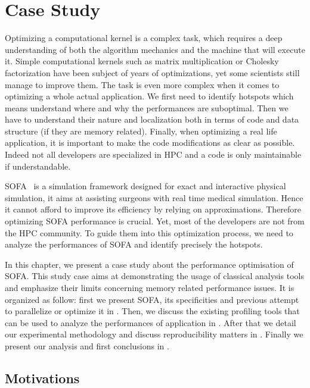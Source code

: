 \chapter{Case Study}
\label{chap:perf}

Optimizing a computational kernel is a complex task, which requires a deep understanding of both the algorithm mechanics and the machine that will execute it.
Simple computational kernels such as matrix multiplication or Cholesky factorization have been subject of years of optimizations, yet some scientists still manage to improve them.
The task is even more complex when it comes to optimizing a whole actual application.
We first need to identify hotspots which means understand where and why the performances are suboptimal.
Then we have to understand their nature and localization both in terms of code and data structure (if they are memory related).
Finally, when optimizing a real life application, it is important to make the code modifications as clear as possible.
Indeed not all developers are specialized in \gls{HPC} and a code is only maintainable if understandable.

\gls{SOFA}~\cite{Allard07SOFA} is a simulation framework designed for exact and interactive physical simulation, it aims at assisting surgeons with real time medical simulation.
Hence  it cannot afford to improve its efficiency by relying on approximations.
Therefore optimizing \gls{SOFA} performance is crucial.
Yet, most of the developers are not from the \gls{HPC} community.
To guide them into this optimization process, we need to analyze the  performances of \gls{SOFA} and identify precisely the hotspots.

In this chapter, we present a case study about the performance optimisation of \gls{SOFA}.
This study case aims at demonstrating the usage of classical analysis tools and emphasize their limits concerning memory related performance issues.
It is organized as follow: first we present \gls{SOFA}, its specificities and previous attempt to parallelize or optimize it in .
Then, we discuss the existing profiling tools that can be used to analyze the performances of application in .
After that we detail our experimental methodology and discuss reproducibility matters in .
Finally we present our analysis and first conclusions in .

\section{Motivations}
\label{sec:motivations}

